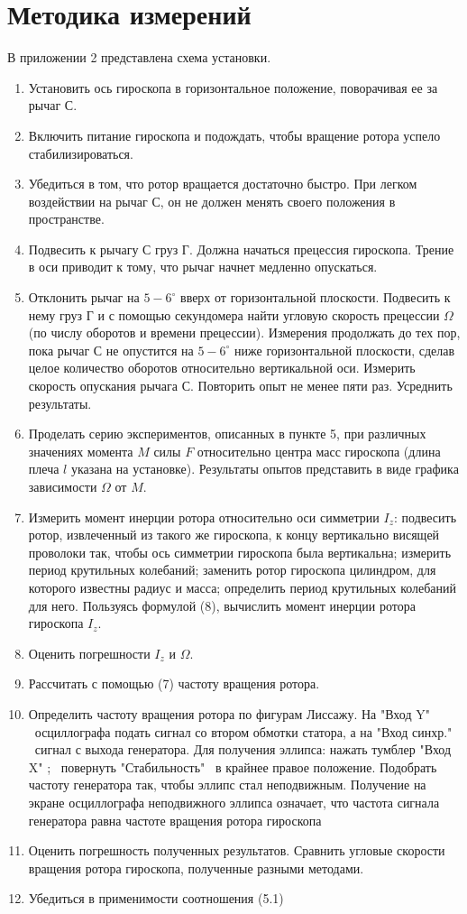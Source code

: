 \documentclass[a4paper]{article}
\begin{document}
\section{Методика измерений}
В приложении 2 представлена схема установки.
\begin{enumerate}
	\item Установить ось гироскопа в горизонтальное положение, поворачивая ее за рычаг С.
	\item Включить питание гироскопа и подождать, чтобы вращение ротора успело стабилизироваться.
	\item Убедиться в том, что ротор вращается достаточно быстро. При легком воздействии на рычаг С, он не должен менять своего положения в пространстве.
	\item Подвесить к рычагу С груз Г. Должна начаться прецессия гироскопа. Трение в оси приводит к тому, что рычаг начнет медленно опускаться.
	\item Отклонить рычаг на $5-6^{\circ}$ вверх от горизонтальной плоскости. Подвесить к нему груз Г и с помощью секундомера найти угловую скорость прецессии $\Omega$ (по числу оборотов и времени прецессии). Измерения продолжать до тех пор, пока рычаг С не опустится на $5-6^{\circ}$ ниже горизонтальной плоскости, сделав целое количество оборотов относительно вертикальной оси. Измерить скорость опускания рычага С. Повторить опыт не менее пяти раз. Усреднить результаты.
	\item Проделать серию экспериментов, описанных в пункте 5, при различных значениях момента $M$ силы $F$ относительно центра масс гироскопа (длина плеча $l$ указана на установке). Результаты опытов представить в виде графика зависимости $\Omega$ от $M$.
	\item Измерить момент инерции ротора относительно оси симметрии $I_z$: подвесить ротор, извлеченный из такого же гироскопа, к концу вертикально висящей проволоки так, чтобы ось симметрии гироскопа была вертикальна; измерить период крутильных колебаний; заменить ротор гироскопа цилиндром, для которого известны радиус и масса; определить период крутильных колебаний для него. Пользуясь формулой (8), вычислить момент инерции ротора гироскопа $I_z$.
	\item Оценить погрешности $I_z$ и $\Omega$.
	\item Рассчитать с помощью (7) частоту вращения ротора.
	\item Определить частоту вращения ротора по фигурам Лиссажу. На "Вход Y" \ осциллографа подать сигнал со втором обмотки статора, а на "Вход синхр." \ сигнал с выхода генератора. Для получения эллипса: нажать тумблер "Вход X" ; \ повернуть "Стабильность" \ в крайнее правое положение. Подобрать частоту генератора так, чтобы эллипс стал неподвижным. Получение на экране осциллографа неподвижного эллипса означает, что частота сигнала генератора равна частоте вращения ротора гироскопа
	\item Оценить погрешность полученных результатов. Сравнить угловые скорости вращения ротора гироскопа, полученные разными методами.
	\item Убедиться в применимости соотношения (5.1)
\end{enumerate}
\end{document}
